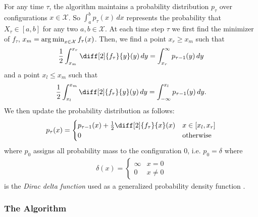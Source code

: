 For any time $\tau$, the algorithm maintains a probability distribution $p_{\tau}$ over configurations $x \in \mathcal{X}$. So $\int_a^b p_{\tau}(x) \,dx$ represents the probability that $X_{\tau} \in [a,b]$ for any two $a, b \in \mathcal{X}$. At each time step $\tau$ we first find the minimizer of $f_{\tau}$, $x_m = \operatorname*{arg\,min}_{x \in \mathcal{X}} f_{\tau}(x)$. Then, we find a point $x_r \geq x_m$ such that \begin{align}\label{eq:ud:probabilistic:right}
    \frac{1}{2} \int_{x_m}^{x_r} \diff[2]{f_{\tau}}{y}(y) \,dy = \int_{x_r}^{\infty} p_{\tau-1}(y) \,dy
\end{align} and a point $x_l \leq x_m$ such that \begin{align}\label{eq:ud:probabilistic:left}
    \frac{1}{2} \int_{x_l}^{x_m} \diff[2]{f_{\tau}}{y}(y) \,dy = \int_{-\infty}^{x_l} p_{\tau-1}(y) \,dy.
\end{align} We then update the probability distribution as follows: \begin{align}\label{eq:ud:probabilistic:update}
    p_{\tau}(x) = \begin{cases}
        p_{\tau-1}(x) + \frac{1}{2} \diff[2]{f_{\tau}}{x}(x) & x \in [x_l,x_r] \\
        0 & \text{otherwise}
    \end{cases}
\end{align} where $p_0$ assigns all probability mass to the configuration $0$, i.e. $p_0 = \delta$ where \begin{align*}
    \delta(x) = \begin{cases}
        \infty & x = 0 \\
        0 & x \neq 0
    \end{cases}
\end{align*} is the \textit{Dirac delta function} used as a generalized probability density function \cite{Salasnich2015}.

\subsubsection{The Algorithm}

